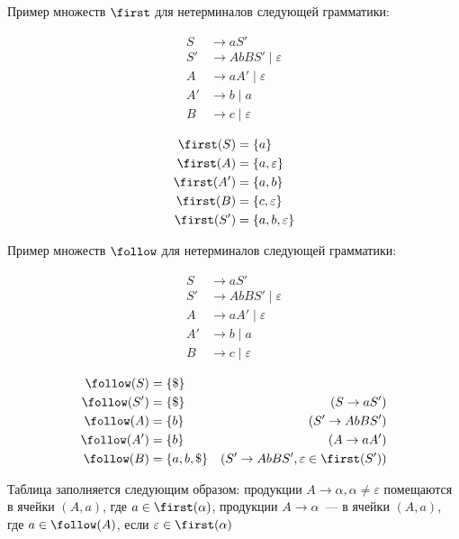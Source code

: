 Пример множеств $\first$ для нетерминалов следующей грамматики:

\begin{multicols}{2}
\begin{align*}
  S  &\to a S' \\
  S' &\to A b B S' \mid \varepsilon \\
  A  &\to a A' \mid \varepsilon \\
  A' &\to b \mid a \\
  B  &\to c \mid \varepsilon
\end{align*}

\columnbreak

\begin{align*}
  \first(S)  &= \{ a \} \\
  \first(A)  &= \{ a, \varepsilon \} \\
  \first(A') &= \{ a, b \} \\
  \first(B)  &= \{ c, \varepsilon \} \\
  \first(S') &= \{ a, b, \varepsilon \}
\end{align*}
\end{multicols}

Пример множеств $\follow$ для нетерминалов следующей грамматики:

\begin{multicols}{2}
\begin{align*}
  S  &\to a S' \\
  S' &\to A b B S' \mid \varepsilon \\
  A  &\to a A' \mid \varepsilon \\
  A' &\to b \mid a \\
  B  &\to c \mid \varepsilon
\end{align*}

\columnbreak

\begin{align*}
  \follow(S)  &= \{ \$ \} & \\
  \follow(S') &= \{ \$ \} &(S \to a S')\\
  \follow(A)  &= \{ b \}  &(S' \to A b B S') \\
  \follow(A') &= \{ b \}  &(A \to a A')\\
  \follow(B)  &= \{ a, b, \$ \} &(S' \to A b B S', \varepsilon \in \first(S'))
\end{align*}
\end{multicols}

Таблица заполняется следующим образом: продукции $A \to \alpha, \alpha \neq \varepsilon$ помещаются в ячейки $(A, a)$, где $a \in \first(\alpha)$, продукции $A \to \alpha$~--- в ячейки $(A, a)$, где $a \in \follow(A)$, если $\varepsilon \in \first(\alpha)$

